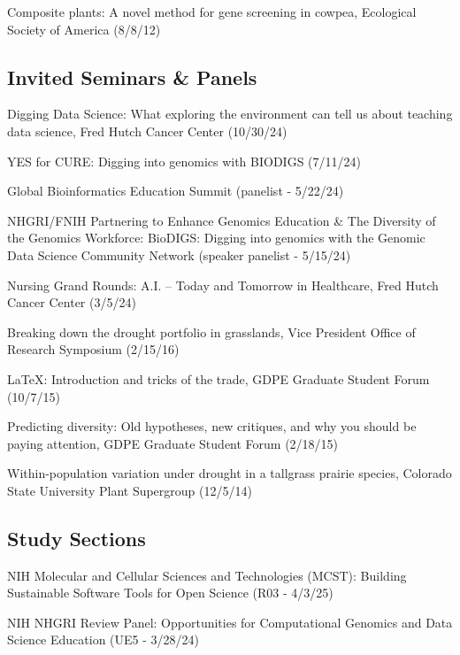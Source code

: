 \documentclass{cv}
\begin{document}
Composite plants: A novel method for gene screening in cowpea, Ecological Society of America (8/8/12)

\subsection*{Invited Seminars \& Panels}

Digging Data Science: What exploring the environment can tell us about teaching data science, Fred Hutch Cancer Center (10/30/24)

YES for CURE: Digging into genomics with BIODIGS (7/11/24)

Global Bioinformatics Education Summit (panelist - 5/22/24) %

NHGRI/FNIH Partnering to Enhance Genomics Education \& The Diversity of the Genomics Workforce: BioDIGS: Digging into genomics with the Genomic Data Science Community Network (speaker panelist - 5/15/24)

Nursing Grand Rounds: A.I. – Today and Tomorrow in Healthcare, Fred Hutch Cancer Center (3/5/24)

Breaking down the drought portfolio in grasslands, Vice President Office of Research Symposium (2/15/16)

\LaTeX: Introduction and tricks of the trade, GDPE Graduate Student Forum (10/7/15)

Predicting diversity: Old hypotheses, new critiques, and why you should be paying attention, GDPE Graduate Student Forum (2/18/15)

Within-population variation under drought in a tallgrass prairie species, Colorado State University Plant Supergroup (12/5/14)

\subsection*{Study Sections}

NIH Molecular and Cellular Sciences and Technologies (MCST): Building Sustainable Software Tools for Open Science (R03 - 4/3/25)

NIH NHGRI Review Panel: Opportunities for Computational Genomics and Data Science Education (UE5 - 3/28/24)

\end{document}
